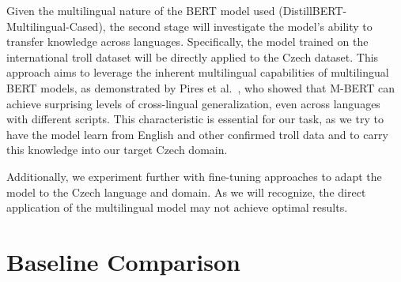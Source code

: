 \documentclass[twoside]{ctuthesis}
\theoremstyle{plain}
\theoremstyle{definition}
\theoremstyle{note}
\begin{document}
Given the multilingual nature of the BERT model used (DistillBERT-Multilingual-Cased), the second stage will investigate the model's ability to transfer knowledge across languages. Specifically, the model trained on the international troll dataset will be directly applied to the Czech dataset. This approach aims to leverage the inherent multilingual capabilities of multilingual BERT models, as demonstrated by Pires et al.~\cite{Pires2019}, who showed that M-BERT can achieve surprising levels of cross-lingual generalization, even across languages with different scripts. This characteristic is essential for our task, as we try to have the model learn from English and other confirmed troll data and to carry this knowledge into our target Czech domain.\par
Additionally, we experiment further with fine-tuning approaches to adapt the model to the Czech language and domain. As we will recognize, the direct application of the multilingual model may not achieve optimal results.\par

\section{Baseline Comparison}
\end{document}
